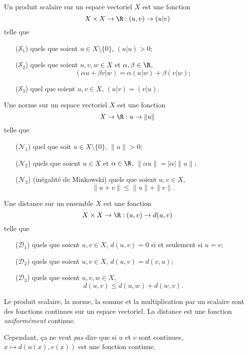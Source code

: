 \begin{mydef}
  Un produit scalaire sur un espace vectoriel $X$ est une fonction
  \[ X \times X \to \R : (u,v) \to (u|v) \]
  telle que
  \begin{enumerate}
    \item[($\mathcal{S}_1$)] quels que soient $u \in X\setminus\{0\}$, $(u|u) > 0$;
    \item[($\mathcal{S}_2$)] quels que soient $u,v,w \in X$ et $\alpha,\beta \in \R$,
      \[ (\alpha u + \beta v|w) = \alpha(u|w) + \beta(v|w); \]
    \item[($\mathcal{S}_3$)] quel que soient $u,v \in X$, $(u|v) = (v|u)$.
  \end{enumerate}
\end{mydef}
\begin{mydef}[Norme]
  Une norme sur un espace vectoriel $X$ est une fonction
  \[ X \to \R : u \to \|u\| \]
  telle que
  \begin{enumerate}
    \item[($\mathcal{N}_1$)] quel que soit $u \in X\setminus\{0\}$, $\|u\| > 0$;
    \item[($\mathcal{N}_2$)] quels que soient $u \in X$ et $\alpha \in \R$, $\|\alpha u\| = |\alpha|\|u\|$;
    \item[($\mathcal{N}_3$)] (inégalité de {\sc Minkowski}) quels que soient $u,v \in X$,
      \[ \|u + v\| \leq \|u\| + \|v\|. \]
  \end{enumerate}
\end{mydef}
\begin{mydef}[Distance]
  Une distance sur un ensemble $X$ est une fonction
  \[ X \times X \to \R : (u,v) \to d(u,v) \]
  telle que
  \begin{enumerate}
    \item[($\mathcal{D}_1$)] quels que soient $u,v \in X$, $d(u,v) = 0$ si et seulement
      si $u = v$;
    \item[($\mathcal{D}_2$)] quels que soient $u,v \in X$, $d(u,v) = d(v,u)$;
    \item[($\mathcal{D}_3$)] quels que soient $u,v,w \in X$,
      \[ d(u,v) \leq d(u,w) + d(w,v). \]
  \end{enumerate}
\end{mydef}

\begin{myprop}[9.2, 11.5b]
  Le produit scalaire, la norme, la somme et la multiplication par un scalaire
  sont des fonctions continues sur un espace vectoriel.
  La distance est une fonction \emph{uniformément} continue.

  Cependant, ça ne veut \emph{pas} dire que si $u$ et $v$ sont continues,
  $x \mapsto d(u(x),v(x))$ est une fonction continue.
\end{myprop}

